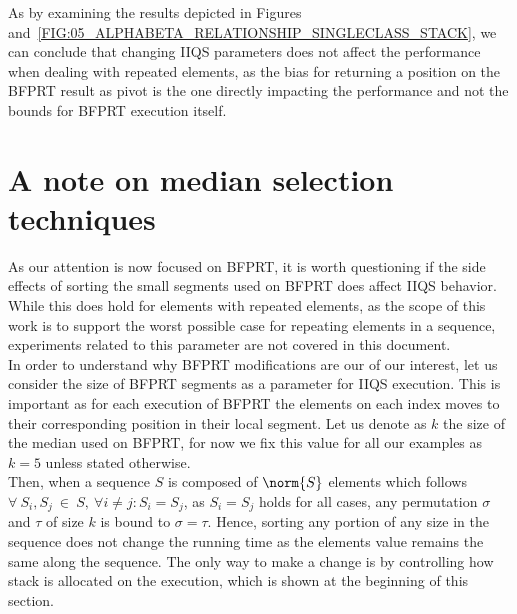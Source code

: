 As by examining the results depicted in Figures and~\ref{FIG:05_ALPHABETA_RELATIONSHIP_SINGLECLASS_STACK}, we can conclude that changing IIQS parameters does not affect the performance when dealing with repeated elements, as the bias for returning a position on the BFPRT result as pivot is the one directly impacting the performance and not the bounds for BFPRT execution itself.\\

\section{A note on median selection techniques}
\label{SECTION:NOTE_ON_MEDIAN_SELECTION}

As our attention is now focused on BFPRT, it is worth questioning if the side effects of sorting the small segments used on BFPRT does affect IIQS behavior. While this does hold for elements with repeated elements, as the scope of this work is to support the worst possible case for repeating elements in a sequence, experiments related to this parameter are not covered in this document.\\

In order to understand why BFPRT modifications are our of our interest, let us consider the size of BFPRT segments as a parameter for IIQS execution. This is important as for each execution of BFPRT the elements on each index moves to their corresponding position in their local segment. Let us denote as $k$ the size of the median used on BFPRT, for now we fix this value for all our examples as $k=5$ unless stated otherwise.\\

Then, when a sequence $S$ is composed of $\norm{S}$ elements which follows $\forall~S_i, S_j~\in~S,~\forall i \neq j : S_i=S_j$, as $S_i=S_j$ holds for all cases, any permutation $\sigma$ and $\tau$ of size $k$ is bound to $\sigma = \tau$. Hence, sorting any portion of any size in the sequence does not change the running time as the elements value remains the same along the sequence. The only way to make a change is by controlling how stack is allocated on the execution, which is shown at the beginning of this section.\\

\FloatBarrier
